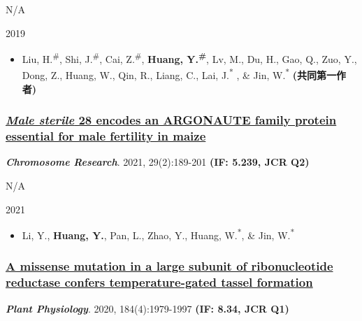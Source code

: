 \documentclass[]{article}
\providecommand{\tightlist}{%
  \setlength{\itemsep}{0pt}\setlength{\parskip}{0pt}}
\begin{document}
N/A

2019

\begin{itemize}
\tightlist
\item
  Liu, H.\textsuperscript{\#}, Shi, J.\textsuperscript{\#}, Cai,
  Z.\textsuperscript{\#}, \textbf{Huang, Y.\textsuperscript{\#}}, Lv,
  M., Du, H., Gao, Q., Zuo, Y., Dong, Z., Huang, W., Qin, R., Liang, C.,
  Lai, J.\textsuperscript{*} , \& Jin, W.\textsuperscript{*}
  \textbf{(共同第一作者)}
\end{itemize}

\hypertarget{male-sterile-28-encodes-an-argonaute-family-protein-essential-for-male-fertility-in-maize}{%
\subsubsection{\texorpdfstring{\href{https://doi.org/10.1007/s10577-021-09653-6}{\emph{Male
sterile} 28 encodes an ARGONAUTE family protein essential for male
fertility in
maize}}{Male sterile 28 encodes an ARGONAUTE family protein essential for male fertility in maize}}\label{male-sterile-28-encodes-an-argonaute-family-protein-essential-for-male-fertility-in-maize}}

\textbf{\emph{Chromosome Research}}. 2021, 29(2):189-201 \textbf{(IF:
5.239, JCR Q2)}

N/A

2021

\begin{itemize}
\tightlist
\item
  Li, Y., \textbf{Huang, Y.}, Pan, L., Zhao, Y., Huang,
  W.\textsuperscript{*}, \& Jin, W.\textsuperscript{*}
\end{itemize}

\hypertarget{a-missense-mutation-in-a-large-subunit-of-ribonucleotide-reductase-confers-temperature-gated-tassel-formation}{%
\subsubsection{\texorpdfstring{\href{https://doi.org/10.1104/pp.20.00219}{A
missense mutation in a large subunit of ribonucleotide reductase confers
temperature-gated tassel
formation}}{A missense mutation in a large subunit of ribonucleotide reductase confers temperature-gated tassel formation}}\label{a-missense-mutation-in-a-large-subunit-of-ribonucleotide-reductase-confers-temperature-gated-tassel-formation}}

\textbf{\emph{Plant Physiology}}. 2020, 184(4):1979-1997 \textbf{(IF:
8.34, JCR Q1)}
\end{document}

